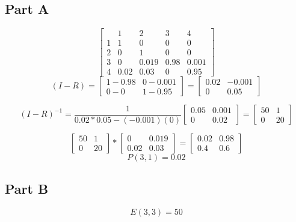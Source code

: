 \documentclass{article}\usepackage[]{graphicx}\usepackage[]{color}
\begin{document}
\subsection*{Part A}
\begin{equation}
\left[\begin{array}{ccccc}
 & 1 & 2 & 3 & 4\\
1 & 1 & 0 & 0 & 0\\
2 & 0 & 1 & 0 & 0\\
3 & 0 & 0.019 & 0.98 & 0.001\\
4 & 0.02 & 0.03 & 0 & 0.95
\end{array}\right]
\end{equation}
\begin{equation}
(I-R) = \left[\begin{array}{cc}
1-0.98 & 0-0.001\\
0-0 & 1-0.95
\end{array}\right]=\left[\begin{array}{cc}
0.02 & -0.001\\
0 & 0.05
\end{array}\right]
\end{equation}

\begin{equation}
(I-R)^{-1} = \frac{1}{0.02*0.05-(-0.001)(0)}\left[\begin{array}{cc}
0.05 & 0.001\\
0 & 0.02\end{array}\right]=\left[\begin{array}{cc}
50 & 1\\
0 & 20\end{array}\right]
\end{equation}

\begin{equation}
\left[\begin{array}{cc}
50 & 1\\
0 & 20\end{array}\right] * \left[\begin{array}{cc}
0 & 0.019\\
0.02 & 0.03\end{array}\right] = \left[\begin{array}{cc}
0.02 & 0.98\\
0.4 & 0.6\end{array}\right]
\end{equation}
\begin{equation}
P(3,1) = 0.02
\end{equation}
\subsection*{Part B}
\begin{equation}
E(3,3)=50
\end{equation}
\end{document}

